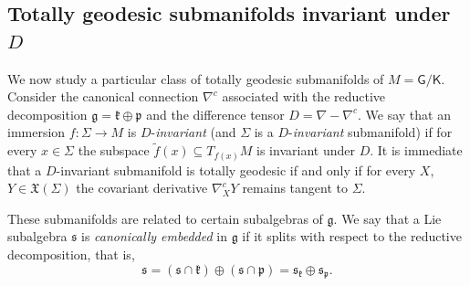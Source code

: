 \documentclass[11pt,a4paper,final]{amsart}
\newcommand{\s}{\mathsf}
\newcommand{\g}{\mathfrak}
\renewcommand{\tilde}{\widetilde}
\theoremstyle{definition}
\begin{document}
\subsection{Totally geodesic submanifolds invariant under $D$}\label{subsec:Dinvtg}

We now study a particular class of totally geodesic submanifolds of $M=\s{G}/\s{K}$.
Consider the canonical connection $\nabla^{c}$ associated with the reductive decomposition $\g{g}=\g{k}\oplus\g{p}$ and the difference tensor $D=\nabla-\nabla^{c}$.
We say that an immersion $f\colon \Sigma\to M$ is $D$-\textit{invariant} (and $\Sigma$ is a $D$-\textit{invariant} submanifold) if for every $x\in\Sigma$ the subspace $\tilde{f}(x)\subseteq T_{f(x)}M$ is invariant under $D$.
It is immediate that a $D$-invariant submanifold is totally geodesic if and only if for every $X$, $Y\in\g{X}(\Sigma)$ the covariant derivative $\nabla^{c}_{X}Y$ remains tangent to $\Sigma$.

These submanifolds are related to certain subalgebras of $\g{g}$.
We say that a Lie subalgebra $\g{s}$ is \textit{canonically embedded} in $\g{g}$ if it splits with respect to the reductive decomposition, that is,
\[
	\g{s}=(\g{s}\cap \g{k})\oplus (\g{s}\cap \g{p})=\g{s}_\g{k}\oplus \g{s}_{\g{p}}.
\]
\end{document}
